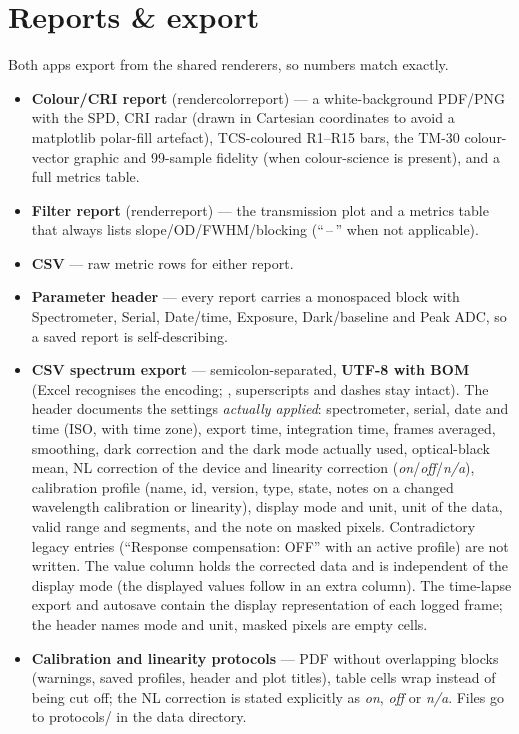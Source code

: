 \documentclass[12pt,a4paper]{article}
\DeclareRobustCommand{\code}[1]{{\ttfamily\small\def\_{\rawus\allowbreak}#1}}
\DeclareRobustCommand{\file}[1]{{\ttfamily\small\def\_{\rawus\allowbreak}#1}}
\begin{document}
\section{Reports \& export}
Both apps export from the shared renderers, so numbers match exactly.
\begin{itemize}
  \item \textbf{Colour/CRI report} (\code{render\_color\_report}) --- a white-background
        PDF/PNG with the SPD, CRI radar (drawn in Cartesian coordinates to avoid a
        matplotlib polar-fill artefact), TCS-coloured R1--R15 bars, the TM-30
        colour-vector graphic and 99-sample fidelity (when colour-science is
        present), and a full metrics table.
  \item \textbf{Filter report} (\code{render\_report}) --- the transmission plot and
        a metrics table that always lists slope/OD/FWHM/blocking (``\,--\,'' when
        not applicable).
  \item \textbf{CSV} --- raw metric rows for either report.
  \item \textbf{Parameter header} --- every report carries a monospaced block with
        Spectrometer, Serial, Date/time, Exposure, Dark/baseline and Peak ADC, so a
        saved report is self-describing.
  \item \textbf{CSV spectrum export} --- semicolon-separated, \textbf{UTF-8 with
        BOM} (Excel recognises the encoding; \textmu, superscripts and dashes stay
        intact). The header documents the settings \emph{actually applied}:
        spectrometer, serial, date and time (ISO, with time zone), export time,
        integration time, frames averaged, smoothing, dark correction and the
        dark mode actually used, optical-black mean, NL correction of the device
        and linearity correction (\emph{on}/\emph{off}/\emph{n/a}), calibration
        profile (name, id, version, type, state, notes on a changed wavelength
        calibration or linearity), display mode and unit, unit of the data, valid
        range and segments, and the note on masked pixels. Contradictory legacy
        entries (``Response compensation: OFF'' with an active profile) are not
        written. The value column holds the corrected data and is independent of the
        display mode (the displayed values follow in an extra column). The
        time-lapse export and autosave contain the display representation of
        each logged frame; the header names mode and unit, masked pixels are
        empty cells.
  \item \textbf{Calibration and linearity protocols} --- PDF without overlapping
        blocks (warnings, saved profiles, header and plot titles), table cells
        wrap instead of being cut off; the NL correction is stated explicitly as
        \emph{on}, \emph{off} or \emph{n/a}. Files go to \file{protocols/} in the
        data directory.
\end{itemize}
\end{document}
